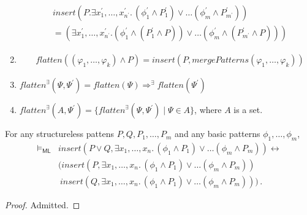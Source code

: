 \documentclass{article}
\newcommand{\ML}{\mathsf{ML}}
\begin{document}
\begin{definition}
\begin{enumerate}
\begin{align*}
            & \mathit{insert}(P. \exists x^\prime_1,\ldots,x^\prime_{n^\prime}.\, (\phi^\prime_1 \land P^\prime_1) \lor \ldots (\phi^\prime_m \land P^\prime_{m^\prime}))
            \\& = (\exists x^\prime_1,\ldots,x^\prime_{n^\prime}. (\phi^\prime_1 \land (P^\prime_1 \land P)) \lor \ldots (\phi^\prime_m \land (P^\prime_{m^\prime} \land P)))
    \end{align*}    
    \item
        \begin{align*}
            & \mathit{flatten}((\varphi_1, \ldots, \varphi_k) \land P)
            = \mathit{insert}(P, \mathit{mergePatterns}(\varphi_1, \ldots, \varphi_k))
    \end{align*}
    \item $\mathit{flatten}^\exists(\Psi, \Psi^\prime) = \mathit{flatten}(\Psi) \Rightarrow^\exists \mathit{flatten}(\Psi^\prime)$
    \item $\mathit{flatten}^\exists(A, \Psi^\prime) = \{ \mathit{flatten}^\exists(\Psi, \Psi^\prime) \mid \Psi \in A \}$, where $A$ is a set.
\end{enumerate}
\end{definition}

\begin{lemma}\label{lem:insert}
  For any structureless pattens $P, Q, P_1, \ldots, P_m$
  and any basic patterns $\phi_1, \ldots, \phi_m$,
    \begin{align*}
        \vDash_\ML & \mathit{insert}(P \lor Q, \exists x_1,\ldots,x_{n}.\, (\phi_1 \land P_1) \lor \ldots (\phi_m \land P_{m})) \leftrightarrow
        \\ & ( \mathit{insert}(P, \exists x_1,\ldots,x_{n}.\, (\phi_1 \land P_1) \lor \ldots (\phi_m \land P_{m}))
        \\ & \ \mathit{insert}(Q, \exists x_1,\ldots,x_{n}.\, (\phi_1 \land P_1) \lor \ldots (\phi_m \land P_{m})) ) \, .
    \end{align*}
\end{lemma}
\begin{proof}
Admitted.
\end{proof}
\end{document}
